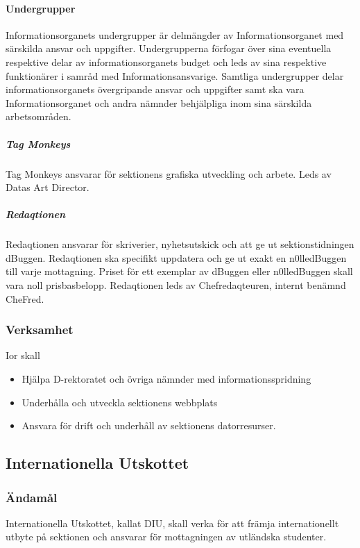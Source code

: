 \documentclass{dgovdoc}
\begin{document}
\paragraph{Undergrupper}

Informationsorganets undergrupper är delmängder av Informationsorganet
med särskilda ansvar och uppgifter. Undergrupperna förfogar
över sina eventuella respektive delar av informationsorganets budget
och leds av sina respektive funktionärer i samråd med Informationsansvarige.
Samtliga undergrupper delar informationsorganets
övergripande ansvar och uppgifter samt ska vara Informationsorganet
och andra nämnder behjälpliga inom sina särskilda arbetsområden.

\subparagraph{Tag Monkeys}

Tag Monkeys ansvarar för sektionens grafiska utveckling och
arbete. Leds av Datas Art Director.

\subparagraph{Redaqtionen}

Redaqtionen ansvarar för skriverier, nyhetsutskick och att ge
ut sektionstidningen dBuggen. Redaqtionen ska specifikt uppdatera
och ge ut exakt en n0lledBuggen till varje mottagning.
Priset för ett exemplar av dBuggen eller n0lledBuggen skall
vara noll prisbasbelopp. Redaqtionen leds av Chefredaqteuren,
internt benämnd CheFred.

\subsubsection{Verksamhet}

Ior skall

\begin{itemize}
  \item Hjälpa D-rektoratet och övriga nämnder med informationsspridning
  \item Underhålla och utveckla sektionens webbplats
  \item Ansvara för drift och underhåll av sektionens datorresurser.
\end{itemize}

\subsection{Internationella Utskottet}

\subsubsection{Ändamål}

Internationella Utskottet, kallat DIU, skall verka för att främja
internationellt utbyte på sektionen och ansvarar för mottagningen av utländska
studenter.
\end{document}
